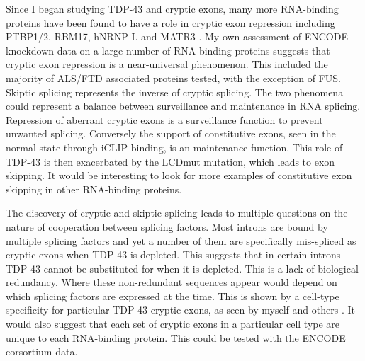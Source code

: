Since I began studying TDP-43 and cryptic exons, many more RNA-binding proteins have been found to have a role in cryptic exon repression including PTBP1/2, RBM17, hNRNP L and MATR3 \citep{Ling2016,Tan2016,McClory2018,Attig2018}. 
My own assessment of ENCODE knockdown data on a large number of RNA-binding proteins suggests that cryptic exon repression is a near-universal phenomenon. 
This included the majority of ALS/FTD associated proteins tested, with the exception of FUS.
Skiptic splicing represents the inverse of cryptic splicing.
The two phenomena could represent a balance between surveillance and maintenance in RNA splicing.
Repression of aberrant cryptic exons is a surveillance function to prevent unwanted splicing.
Conversely the support of constitutive exons, seen in the normal state through iCLIP binding, is an maintenance function.
This role of TDP-43 is then exacerbated by the LCDmut mutation, which leads to exon skipping. 
It would be interesting to look for more examples of constitutive exon skipping in other RNA-binding proteins.

The discovery of cryptic and skiptic splicing leads to multiple questions on the nature of cooperation between splicing factors.
Most introns are bound by multiple splicing factors and yet a number of them are specifically mis-spliced as cryptic exons when TDP-43 is depleted.
This suggests that in certain introns TDP-43 cannot be substituted for when it is depleted. 
This is a lack of biological redundancy. 
Where these non-redundant sequences appear would depend on which splicing factors are expressed at the time.
This is shown by a cell-type specificity for particular TDP-43 cryptic exons, as seen by myself and others \citep{Jeong2017}. 
It would also suggest that each set of cryptic exons in a particular cell type are unique to each RNA-binding protein.
This could be tested with the ENCODE corsortium data.

